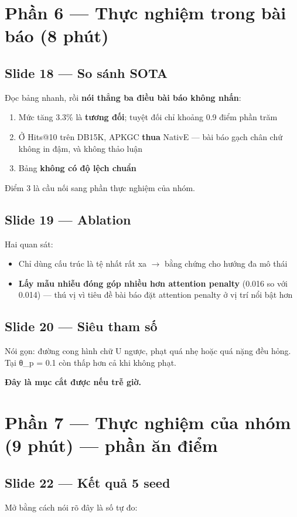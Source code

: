 \documentclass[11pt,a4paper]{article}
\newcommand{\code}[1]{{\ttfamily\small\color{codetext}#1}}
\begin{document}
\section{Phần 6 --- Thực nghiệm trong bài báo (8 phút)}
\subsection{Slide 18 --- So sánh SOTA}
Đọc bảng nhanh, rồi \textbf{nói thẳng ba điều bài báo không nhấn}:

\begin{enumerate}\itemsep2pt
\item Mức tăng 3.3\% là \textbf{tương đối}; tuyệt đối chỉ khoảng 0.9 điểm phần trăm
\item Ở Hits@10 trên DB15K, APKGC \textbf{thua} NativE --- bài báo gạch chân chứ không in đậm, và không thảo luận
\item Bảng \textbf{không có độ lệch chuẩn}
\end{enumerate}
Điểm 3 là cầu nối sang phần thực nghiệm của nhóm.

\subsection{Slide 19 --- Ablation}
Hai quan sát:

\begin{itemize}\itemsep2pt
\item Chỉ dùng cấu trúc là tệ nhất rất xa $\rightarrow$ bằng chứng cho hướng đa mô thái
\item \textbf{Lấy mẫu nhiễu đóng góp nhiều hơn attention penalty} (0.016 so với 0.014) --- thú vị vì tiêu đề bài báo đặt attention penalty ở vị trí nổi bật hơn
\end{itemize}
\subsection{Slide 20 --- Siêu tham số}
Nói gọn: đường cong hình chữ U ngược, phạt quá nhẹ hoặc quá nặng đều hỏng. Tại \code{θ\_p = 0.1} còn thấp hơn cả khi không phạt.

\textbf{Đây là mục cắt được nếu trễ giờ.}

\section{Phần 7 --- Thực nghiệm của nhóm (9 phút) --- phần ăn điểm}
\subsection{Slide 22 --- Kết quả 5 seed}
Mở bằng cách nói rõ đây là số tự đo:
\end{document}
